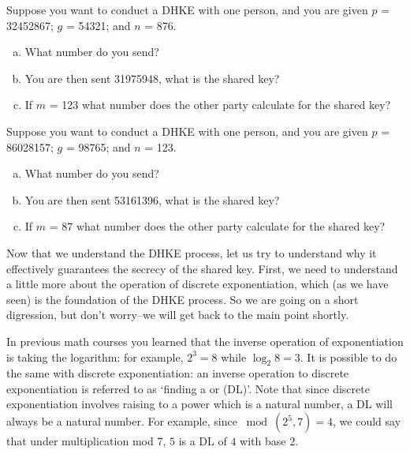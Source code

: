 \begin{exer}
Suppose you want to conduct a DHKE with one person, and you are given $p$ = 32452867; $g$ = 54321; and $n$ = 876.  
\begin{enumerate}[(a)]
\item What number do you send?  

\item You are then sent 31975948, what is the shared key? 

\item If $m$ = 123 what number does the other party calculate for the shared key?
\end{enumerate}
\end{exer}

\begin{exer}
Suppose you want to conduct a DHKE with one person, and you are given $p$ = 86028157; $g$ = 98765; and $n$ = 123.  
\begin{enumerate}[(a)]
\item	What number do you send?  

\item You are then sent 53161396, what is the shared key? 

\item If $m$ = 87 what number does the other party calculate for the shared key?
\end{enumerate}
\end{exer}
Now that we understand the DHKE process, let us try to understand why it effectively guarantees the secrecy of the shared key. First, we need to understand a little more about the operation of discrete exponentiation, which (as we have seen) is the foundation of the DHKE process. So we are going on a short digression, but don't worry--we will get back to the main point shortly. 

In previous math courses you learned that the inverse operation of exponentiation is taking the logarithm: for example, $2^3 = 8$ while $\log_{2}8 = 3$.  It is possible to do the same with discrete exponentiation: an inverse operation to discrete exponentiation is  referred to as `finding a  or (DL)'. Note that since discrete exponentiation involves raising to a power which is a natural number, a  DL will always be a natural number.   For example, since $\bmod(2^5,7)=4$, we could say that under multiplication mod 7,  $5$ is a DL  of $4$ with base $2$.

